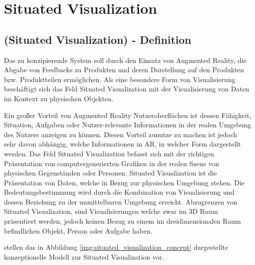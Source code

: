 


\section{Situated Visualization}
\subsection{(Situated Visualization) - Definition}

Das zu konzipierende System soll durch den Einsatz von Augmented Reality, die Abgabe von Feedbacks zu Produkten und deren Darstellung auf den Produkten bzw. Produktteilen ermöglichen. 
Als eine besondere Form von Visualisierung beschäftigt sich das Feld Situated Visualization mit der Visualisierung von Daten im Kontext zu physischen Objekten. 

\cite[S.~239]{DieterSchmalstieg2016} Ein großer Vorteil von Augmented Reality Nutzeroberflächen ist dessen Fähigkeit, Situation, Aufgaben oder Nutzer-relevante Informationen in 
der realen Umgebung des Nutzers anzeigen zu können. Diesen Vorteil zunutze zu machen ist jedoch sehr davon abhängig, welche Informationen in AR, in welcher Form dargestellt werden. 
Das Feld Situated Visualization befasst sich mit der richtigen Präsentation von computergenerierten Grafiken in der realen Szene von physischen Gegenständen oder Personen. \cite[S.~188]{ElSayedNevenA.M.BruceH.ThomasRossT.Smith2015} Situated Visualization ist die Präsentation von Daten, welche in Bezug zur physischen Umgebung stehen. 
Die Bedeutungsbestimmung wird durch die Kombination von Visualisierung und dessen Beziehung zu der unmittelbaren Umgebung erreicht. \cite[S.~240]{DieterSchmalstieg2016} Abzugrenzen von 
Situated Visualization, sind Visualisierungen welche zwar im 3D Raum präsentiert werden, jedoch keinen Bezug zu einem im dreidimensionalen Raum befindlichen Objekt, Person oder Aufgabe haben.

\cite[S.~192]{ElSayedNevenA.M.BruceH.ThomasRossT.Smith2015} \cite[S.~2]{WesleyWillettYvonneJansen} stellen das in Abbildung \ref{img:situated_visualization_concept} dargestellte konzeptionelle Modell 
zur Situated Visualization vor.

